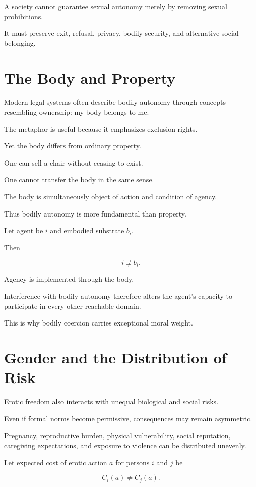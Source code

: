 \documentclass[11pt,oneside]{book}
\theoremstyle{definition}
\theoremstyle{remark}
\begin{document}
A society cannot guarantee sexual autonomy merely by removing sexual prohibitions.

It must preserve exit, refusal, privacy, bodily security, and alternative social belonging.

\section{The Body and Property}

Modern legal systems often describe bodily autonomy through concepts resembling ownership: my body belongs to me.

The metaphor is useful because it emphasizes exclusion rights.

Yet the body differs from ordinary property.

One can sell a chair without ceasing to exist.

One cannot transfer the body in the same sense.

The body is simultaneously object of action and condition of agency.

Thus bodily autonomy is more fundamental than property.

Let agent be \(i\) and embodied substrate \(b_i\).

Then

\[
i\not\perp b_i.
\]

Agency is implemented through the body.

Interference with bodily autonomy therefore alters the agent's capacity to participate in every other reachable domain.

This is why bodily coercion carries exceptional moral weight.

\section{Gender and the Distribution of Risk}

Erotic freedom also interacts with unequal biological and social risks.

Even if formal norms become permissive, consequences may remain asymmetric.

Pregnancy, reproductive burden, physical vulnerability, social reputation, caregiving expectations, and exposure to violence can be distributed unevenly.

Let expected cost of erotic action \(a\) for persons \(i\) and \(j\) be

\[
C_i(a)
\neq
C_j(a).
\]
\end{document}
